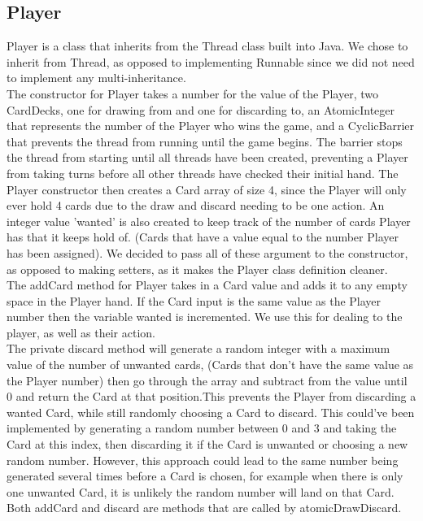 \documentclass[11p]{article}
\begin{document}
\subsection{Player}
Player is a class that inherits from the Thread class built into Java. We chose to inherit from Thread, as opposed to implementing Runnable since we did not need to implement any multi-inheritance.\\
The constructor for Player takes a number for the value of the Player, two CardDecks, one for drawing from and one for discarding to, an AtomicInteger that represents the number of the Player who wins the game, and a CyclicBarrier that prevents the thread from running until the game begins. The barrier stops the thread from starting until all threads have been created, preventing a Player from taking turns before all other threads have checked their initial hand. The Player constructor then creates a Card array of size 4, since the Player will only ever hold 4 cards due to the draw and discard needing to be one action. An integer value 'wanted' is also created to keep track of the number of cards Player has that it keeps hold of. (Cards that have a value equal to the number Player has been assigned).  We decided to pass all of these argument to the constructor, as opposed to making setters, as it makes the Player class definition cleaner.\\
The addCard method for Player takes in a Card value and adds it to any empty space in the Player hand. If the Card input is the same value as the Player number then the variable wanted is incremented. We use this for dealing to the player, as well as their action.\\
The private discard method will generate a random integer with a maximum value of the number of unwanted cards, (Cards that don't have the same value as the Player number) then go through the array and subtract from the value until 0 and return the Card at that position.This prevents the Player from discarding a wanted Card, while still randomly choosing a Card to discard. This could've been implemented by generating a random number between 0 and 3 and taking the Card at this index, then discarding it if the Card is unwanted or choosing a new random number. However, this approach could lead to the same number being generated several times before a Card is chosen, for example when there is only one unwanted Card, it is unlikely the random number will land on that Card.\\
Both addCard and discard are methods that are called by atomicDrawDiscard.\\
\end{document}
